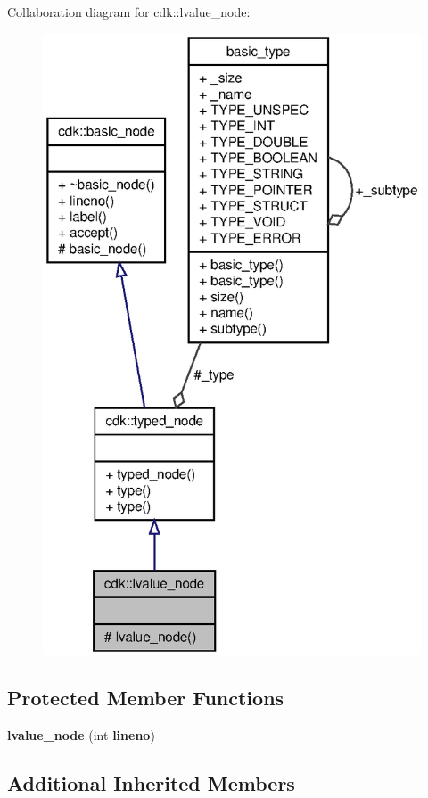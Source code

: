 Collaboration diagram for cdk\+:\+:lvalue\+\_\+node\+:
\nopagebreak
\begin{figure}[H]
\begin{center}
\leavevmode
\includegraphics[width=322pt]{classcdk_1_1lvalue__node__coll__graph}
\end{center}
\end{figure}
\subsection*{Protected Member Functions}
\begin{DoxyCompactItemize}
\item 
\mbox{\label{classcdk_1_1lvalue__node_ae3f2020c806be939a87f9ae973030a0b}} 
{\bfseries lvalue\+\_\+node} (int \textbf{ lineno})
\end{DoxyCompactItemize}
\subsection*{Additional Inherited Members}


